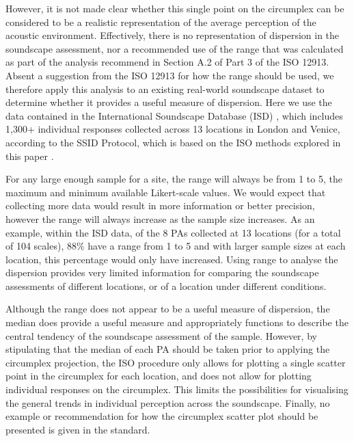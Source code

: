 However, it is not made clear whether this single point on the circumplex can be considered to be a realistic representation of the average perception of the acoustic environment. Effectively, there is no representation of dispersion in the soundscape assessment, nor a recommended use of the range that was calculated as part of the analysis recommend in Section A.2 of Part 3 of the ISO 12913. Absent a suggestion from the ISO 12913 for how the range should be used, we therefore apply this analysis to an existing real-world soundscape dataset to determine whether it provides a useful measure of dispersion. Here we use the data contained in the International Soundscape Database (ISD) \citep{Mitchell2021International}, which includes 1,300+ individual responses collected across 13 locations in London and Venice, according to the SSID Protocol, which is based on the ISO methods explored in this paper \citep{Mitchell2020Soundscape}.

For any large enough sample for a site, the range will always be from 1 to 5, the maximum and minimum available Likert-scale values. We would expect that collecting more data would result in more information or better precision, however the range will always increase as the sample size increases. As an example, within the ISD data, of the 8 PAs collected at 13 locations (for a total of 104 scales), 88\% have a range from 1 to 5 and with larger sample sizes at each location, this percentage would only have increased. Using range to analyse the dispersion provides very limited information for comparing the soundscape assessments of different locations, or of a location under different conditions.

Although the range does not appear to be a useful measure of dispersion, the median does provide a useful measure and appropriately functions to describe the central tendency of the  soundscape assessment of the sample. However, by stipulating that the median of each PA should be taken prior to applying the circumplex projection, the ISO procedure only allows for plotting a single scatter point in the circumplex for each location, and does not allow for plotting individual responses on the circumplex. This limits the possibilities for visualising the general trends in individual perception across the soundscape. Finally, no example or recommendation for how the circumplex scatter plot should be presented is given in the standard.

